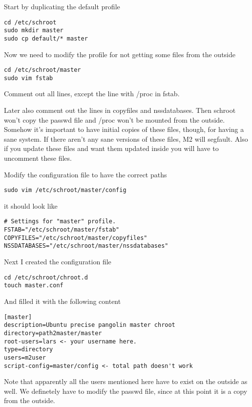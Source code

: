 \documentclass[a4paper]{book}
\begin{document}
Start by duplicating the default profile

\begin{verbatim}
cd /etc/schroot
sudo mkdir master
sudo cp default/* master
\end{verbatim}

Now we need to modify the profile for not getting some files from the outside

\begin{verbatim}
cd /etc/schroot/master
sudo vim fstab
\end{verbatim}

Comment out all lines, except the line with /proc in fstab. 

Later also comment out the lines in copyfiles and nssdatabases.  Then schroot
won't copy the passwd file and /proc won't be mounted from the outside.
Somehow it's important to have initial copies of these files, though, for
having a sane system. If there aren't any sane versions of these files, M2 will
segfault.  Also if you update these files and want them updated inside you will
have to uncomment these files.

Modify the configuration file to have the correct paths

\begin{verbatim}
sudo vim /etc/schroot/master/config
\end{verbatim}

it should look like

\begin{verbatim}
# Settings for "master" profile.
FSTAB="/etc/schroot/master/fstab"
COPYFILES="/etc/schroot/master/copyfiles"
NSSDATABASES="/etc/schroot/master/nssdatabases"
\end{verbatim}

Next I created the configuration file

\begin{verbatim}
cd /etc/schroot/chroot.d
touch master.conf
\end{verbatim}

And filled it with the following content

\begin{verbatim}
[master]
description=Ubuntu precise pangolin master chroot
directory=path2master/master
root-users=lars <- your username here.
type=directory
users=m2user
script-config=master/config <- total path doesn't work
\end{verbatim}

Note that apparently all the users mentioned here have to exist on the outside
as well.  We definetely have to modify the passwd file, since at this point it
is a copy from the outside.
\end{document}
